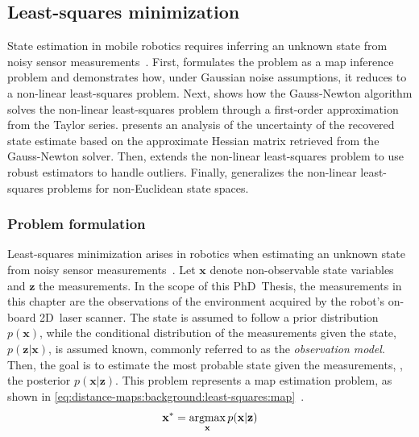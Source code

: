 \subsection{Least-squares minimization}
\label{sec:distance-maps:background:least-squares}

State estimation in mobile robotics requires inferring an unknown state
from noisy sensor measurements~\cite{grisetti:itsm:2010,grisetti:robotics:2020}.
First, 
formulates the problem as a \gls{map} inference problem
and demonstrates how, under Gaussian noise assumptions, it reduces to
a non-linear least-squares problem. Next,
 shows how
the Gauss-Newton algorithm solves the non-linear least-squares problem
through a first-order approximation from the Taylor series.
 presents
an analysis of the uncertainty of the recovered state estimate based on
the approximate Hessian matrix retrieved from the Gauss-Newton solver. Then,
 extends
the non-linear least-squares problem to use robust estimators to handle
outliers. Finally,
 generalizes
the non-linear least-squares problems for non-Euclidean state spaces.

\subsubsection{Problem formulation}
\label{sec:distance-maps:background:least-squares:problem-formulation}

Least-squares minimization arises in robotics when estimating an unknown state
from noisy sensor measurements~\cite{grisetti:robotics:2020}.
Let $\mathbf{x}$ denote non-observable
state variables and $\mathbf{z}$ the measurements.
In the scope of this PhD~Thesis, the measurements in this chapter are the observations of the
environment acquired by the robot's on-board 2D~laser scanner.
The state is assumed to follow a prior distribution $p(\mathbf{x})$,
while the conditional distribution of the measurements given the state,
$p(\mathbf{z}|\mathbf{x})$, is assumed known,
commonly referred to as the \emph{observation model}. Then, the goal
is to estimate the most probable state given the measurements,
\ie, the posterior $p(\mathbf{x}|\mathbf{z})$.
This problem represents a \gls{map} estimation problem, as shown in
\eqref{eq:distance-maps:background:least-squares:map}~\cite{barfoot:book:2017}.
\begin{equation}\label{eq:distance-maps:background:least-squares:map}
\mathbf{x}^* = \operatorname*{argmax}_\mathbf{x} p(\mathbf{x}|\mathbf{z})
\end{equation}

